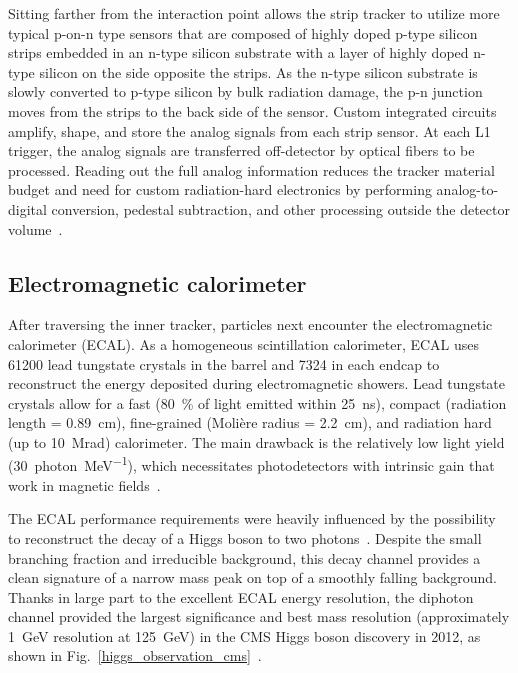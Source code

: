 Sitting farther from the interaction point allows the strip tracker to utilize more typical p-on-n type sensors that are composed of highly doped p-type silicon strips embedded in an n-type silicon substrate with a layer of highly doped n-type silicon on the side opposite the strips. As the n-type silicon substrate is slowly converted to p-type silicon by bulk radiation damage, the p-n junction moves from the strips to the back side of the sensor. Custom integrated circuits amplify, shape, and store the analog signals from each strip sensor. At each L1 trigger, the analog signals are transferred off-detector by optical fibers to be processed. Reading out the full analog information reduces the tracker material budget and need for custom radiation-hard electronics by performing analog-to-digital conversion, pedestal subtraction, and other processing outside the detector volume~\cite{cms_experiment}.



\subsection{Electromagnetic calorimeter}
After traversing the inner tracker, particles next encounter the electromagnetic calorimeter (ECAL). As a homogeneous scintillation calorimeter, ECAL uses \num{61200} lead tungstate crystals in the barrel and \num{7324} in each endcap to reconstruct the energy deposited during electromagnetic showers. Lead tungstate crystals allow for a fast (\SI{80}{\percent} of light emitted within \SI{25}{\ns}), compact (radiation length = \SI{0.89}{cm}), fine-grained (Moli\`ere radius = \SI{2.2}{\cm}), and radiation hard (up to \SI{10}{\mega rad}) calorimeter. The main drawback is the relatively low light yield (\SI{30}{photon\per\mega\electronvolt}), which necessitates photodetectors with intrinsic gain that work in magnetic fields~\cite{cms_experiment, cms_tdr_v1}.

The ECAL performance requirements were heavily influenced by the possibility to reconstruct the decay of a Higgs boson to two photons~\cite{cms_tdr_v2}. Despite the small branching fraction and irreducible background, this decay channel provides a clean signature of a narrow mass peak on top of a smoothly falling background. Thanks in large part to the excellent ECAL energy resolution, the diphoton channel provided the largest significance and best mass resolution (approximately \SI{1}{\GeV} resolution at \SI{125}{\GeV}) in the CMS Higgs boson discovery in 2012, as shown in Fig.~\ref{higgs_observation_cms}~\cite{cms_higgs}.


